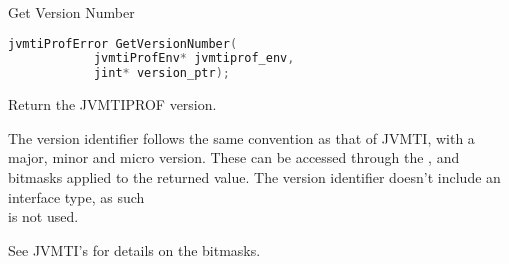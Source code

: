 \begin{apidef}{Get Version Number}
\begin{lstlisting}[language=C]
jvmtiProfError GetVersionNumber(
            jvmtiProfEnv* jvmtiprof_env,
            jint* version_ptr);
\end{lstlisting}

\begin{apidesc}
Return the JVMTIPROF version.

The version identifier follows the same convention as that of JVMTI, with a major, minor and micro version. These can be accessed through the ,  and  bitmasks applied to the returned value. The version identifier doesn't include an interface type, as such \\  is not used.

See JVMTI's  for details on the bitmasks.
\end{apidesc}

\begin{apiphase}
\apiphaseany
\end{apiphase}

\begin{apicap}
\apicaprequired
\end{apicap}

\begin{apiparam}
\end{apiparam}

\apireturnempty

\begin{apierror}
\end{apierror}
\end{apidef}
